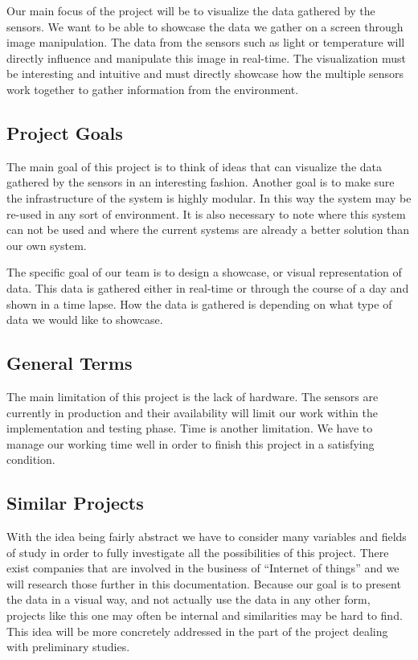 \documentclass[../document.tex]{subfiles}
\begin{document}
Our main focus of the project will be to visualize the data gathered by the sensors. We want to be able to showcase the data we gather on a screen through image manipulation. The data from the sensors such as light or temperature will directly influence and manipulate this image in real-time. The visualization must be interesting and intuitive and must directly showcase how the multiple sensors work together to gather information from the environment.

\subsection*{Project Goals}
The main goal of this project is to think of ideas that can visualize the data gathered by the sensors in an interesting fashion. Another goal is to make sure the infrastructure of the system is highly modular. In this way the system may be re-used in any sort of environment. It is also necessary to note where this system can not be used and where the current systems are already a better solution than our own system.

The specific goal of our team is to design a showcase, or visual representation of data. This data is gathered either in real-time or through the course of a day and shown in a time lapse. How the data is gathered is depending on what type of data we would like to showcase.

\subsection*{General Terms}
The main limitation of this project is the lack of hardware. The sensors are currently in production and their availability will limit our work within the implementation and testing phase. Time is another limitation. We have to manage our working time well in order to finish this project in a satisfying condition.

\subsection*{Similar Projects}
With the idea being fairly abstract we have to consider many variables and fields of study in order to fully investigate all the possibilities of this project. There exist companies that are involved in the business of “Internet of things” and we will research those further in this documentation. Because our goal is to present the data in a visual way, and not actually use the data in any other form, projects like this one may often be internal and similarities may be hard to find. This idea will be more concretely addressed in the part of the project dealing with preliminary studies.
\end{document}
